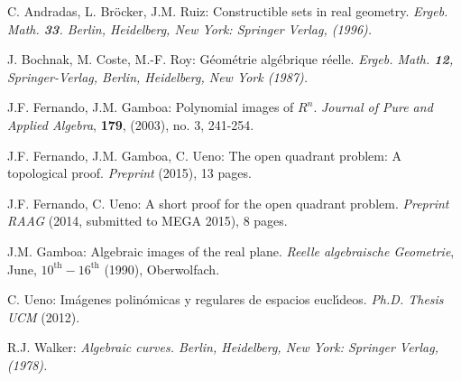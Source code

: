 \documentclass[11pt, a4paper, english, twoside, notitlepage, openright]{report}
\begin{document}
\begin{thebibliography}{ABR}

 C. Andradas, L. Br\"ocker, J.M. Ruiz: Constructible 
sets in real geometry. \em Ergeb. Math. \em{\bf 33}. Berlin, Heidelberg, 
New York: Springer Verlag, (1996).

 J. Bochnak, M. Coste, M.-F. Roy: G\'eom\'etrie
alg\'ebrique r\'eelle. \em Ergeb. Math. \em {\bf 12}, Springer-Verlag,
Berlin, Heidelberg, New York (1987).

 J.F. Fernando, J.M. Gamboa: Polynomial images of $R^n$.
\textit{Journal of Pure and Applied Algebra}, {\bf 179}, (2003), no. 3, 241-254.

 J.F. Fernando, J.M. Gamboa, C. Ueno: The open quadrant problem:
A topological proof. \textit{Preprint} (2015), 13 pages.

 J.F. Fernando, C. Ueno: A short proof for the open quadrant problem.
\textit{Preprint RAAG} (2014, submitted to MEGA 2015), 8 pages.

 J.M. Gamboa: Algebraic images of the real plane. \textit{Reelle algebraische Geometrie}, June,
$10^{\text{th}}-16^{\text{th}}$ (1990), Oberwolfach.

 C. Ueno: Im\'agenes polin\'omicas y regulares de espacios eucl\'\i deos. {\em Ph.D. Thesis UCM} (2012).

 R.J. Walker: \em Algebraic curves. \em Berlin, Heidelberg, 
New York: Springer Verlag, (1978).



\end{thebibliography}
\end{document}
